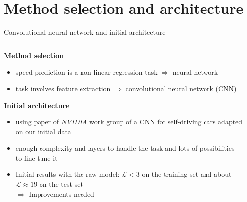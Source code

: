 \section{Method selection and architecture}

\begin{frame}{Convolutional neural network and initial architecture}
	\begin{columns}[c]
		\begin{column}{0.55\textwidth}
			\textbf{Method selection}
			\begin{itemize}
				\item<+-> speed prediction is a non-linear regression task $\Rightarrow$ neural network
				\item<+-> task involves feature extraction $\Rightarrow$ convolutional neural network (CNN)
			\end{itemize}
			\textbf{Initial architecture}
			\begin{itemize}
				\item<+-> using paper of \textit{NVIDIA} work group \cite{NVIDIA2016} of a CNN for self-driving cars adapted on our initial data
				\item<+-> enough complexity and layers to handle the task and lots of possibilities to fine-tune it
				\item<+-> Initial results with the raw model: $\mathcal{L} < 3$ on the training set and about $\mathcal{L} \approx 19$ on the test set\\
				$\Rightarrow$ Improvements needed
			\end{itemize}
		\end{column}
		\begin{column}{0.4\textwidth}

\end{column}
\end{columns}
\end{frame}
